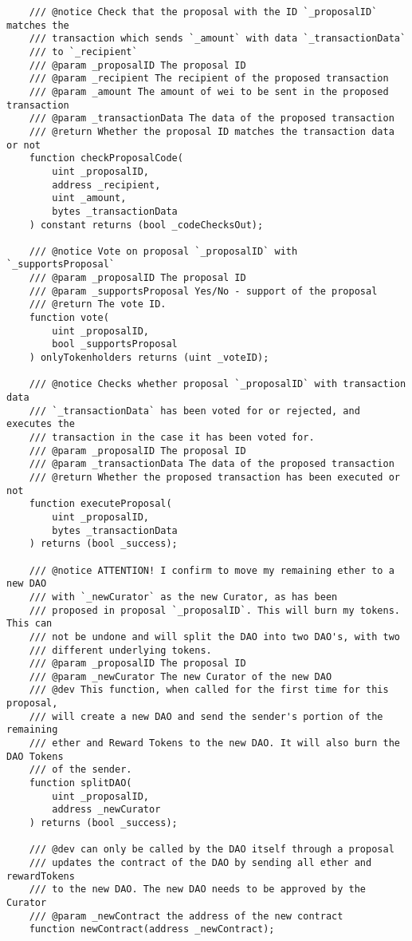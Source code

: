 \documentclass[9pt,oneside]{amsart}
\begin{document}
\begin{appendix}
\begin{verbatim}
    /// @notice Check that the proposal with the ID `_proposalID` matches the
    /// transaction which sends `_amount` with data `_transactionData`
    /// to `_recipient`
    /// @param _proposalID The proposal ID
    /// @param _recipient The recipient of the proposed transaction
    /// @param _amount The amount of wei to be sent in the proposed transaction
    /// @param _transactionData The data of the proposed transaction
    /// @return Whether the proposal ID matches the transaction data or not
    function checkProposalCode(
        uint _proposalID,
        address _recipient,
        uint _amount,
        bytes _transactionData
    ) constant returns (bool _codeChecksOut);

    /// @notice Vote on proposal `_proposalID` with `_supportsProposal`
    /// @param _proposalID The proposal ID
    /// @param _supportsProposal Yes/No - support of the proposal
    /// @return The vote ID.
    function vote(
        uint _proposalID,
        bool _supportsProposal
    ) onlyTokenholders returns (uint _voteID);

    /// @notice Checks whether proposal `_proposalID` with transaction data
    /// `_transactionData` has been voted for or rejected, and executes the
    /// transaction in the case it has been voted for.
    /// @param _proposalID The proposal ID
    /// @param _transactionData The data of the proposed transaction
    /// @return Whether the proposed transaction has been executed or not
    function executeProposal(
        uint _proposalID,
        bytes _transactionData
    ) returns (bool _success);

    /// @notice ATTENTION! I confirm to move my remaining ether to a new DAO
    /// with `_newCurator` as the new Curator, as has been
    /// proposed in proposal `_proposalID`. This will burn my tokens. This can
    /// not be undone and will split the DAO into two DAO's, with two
    /// different underlying tokens.
    /// @param _proposalID The proposal ID
    /// @param _newCurator The new Curator of the new DAO
    /// @dev This function, when called for the first time for this proposal,
    /// will create a new DAO and send the sender's portion of the remaining
    /// ether and Reward Tokens to the new DAO. It will also burn the DAO Tokens
    /// of the sender.
    function splitDAO(
        uint _proposalID,
        address _newCurator
    ) returns (bool _success);

    /// @dev can only be called by the DAO itself through a proposal
    /// updates the contract of the DAO by sending all ether and rewardTokens
    /// to the new DAO. The new DAO needs to be approved by the Curator
    /// @param _newContract the address of the new contract
    function newContract(address _newContract);



\end{verbatim}
\end{appendix}
\end{document}
